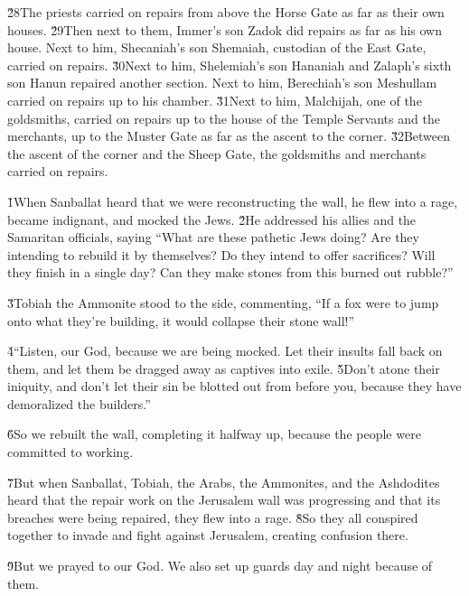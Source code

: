\v{28}The priests carried on repairs from above the Horse Gate as far as their own houses. \v{29}Then next to them, Immer's son Zadok did repairs as far as his own house. Next to him, Shecaniah's son Shemaiah, custodian of the East Gate, carried on repairs. \v{30}Next to him, Shelemiah's son Hananiah and Zalaph's sixth son Hanun repaired another section. Next to him, Berechiah's son Meshullam carried on repairs up to his chamber. \v{31}Next to him, Malchijah, one of the goldsmiths, carried on repairs up to the house of the Temple Servants and the merchants, up to the Muster Gate as far as the ascent to the corner. \v{32}Between the ascent of the corner and the Sheep Gate, the goldsmiths and merchants carried on repairs.

\v{1}When Sanballat heard that we were reconstructing the wall, he flew into a rage, became indignant, and mocked the Jews. \v{2}He addressed his allies and the Samaritan officials, saying ``What are these pathetic Jews doing? Are they intending to rebuild it by themselves? Do they intend to offer sacrifices? Will they finish in a single day? Can they make stones from this burned out rubble?''

\v{3}Tobiah the Ammonite stood to the side, commenting, ``If a fox were to jump onto what they're building, it would collapse their stone wall!''

\v{4}``Listen, our God, because we are being mocked. Let their insults fall back on them, and let them be dragged away as captives into exile. \v{5}Don't atone their iniquity, and don't let their sin be blotted out from before you, because they have demoralized the builders.''

\v{6}So we rebuilt the wall, completing it halfway up, because the people were committed to working.

\v{7}But when Sanballat, Tobiah, the Arabs, the Ammonites, and the Ashdodites heard that the repair work on the Jerusalem wall was progressing and that its breaches were being repaired, they flew into a rage. \v{8}So they all conspired together to invade and fight against Jerusalem, creating confusion there.

\v{9}But we prayed to our God. We also set up guards day and night because of them.

